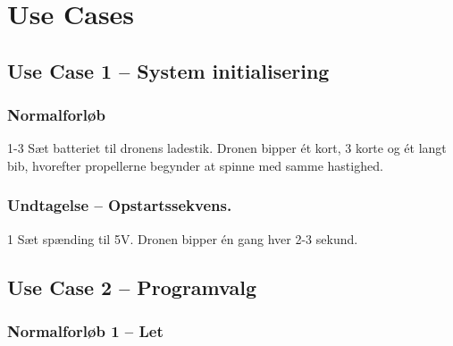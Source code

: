 \documentclass[Main]{subfiles}
\begin{document}
\chapter{Use Cases}

\section{Use Case 1 -- System initialisering}

\subsection*{Normalforløb}
\begin{TestCaseIntro}
\end{TestCaseIntro}

\begin{TestCase}
\TC
{1-3}
{Sæt batteriet til dronens ladestik.}
{Dronen bipper ét kort, 3 korte og ét langt bib, hvorefter propellerne begynder at spinne med samme hastighed.}
{}
\end{TestCase}





\subsection*{Undtagelse -- Opstartssekvens.}

\begin{TestCaseIntro}
\end{TestCaseIntro}

\begin{TestCase}
\TC
{1}
{Sæt spænding til 5V.}
{Dronen bipper én gang hver 2-3 sekund.}
{}
\end{TestCase}






\newpage
\section{Use Case 2 -- Programvalg}

\subsection*{Normalforløb 1 -- Let}
\begin{TestCaseIntro}
\end{TestCaseIntro}
\end{document}
